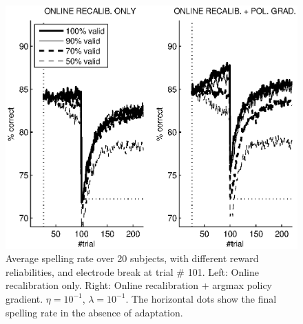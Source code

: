\documentclass[conference]{IEEEtran}
\begin{document}
\begin{figure}
\centerline{
 \includegraphics[width=\linewidth]{figs-copie/fig_invalid}
}
\caption{Average spelling rate over 20 subjects, with different reward reliabilities, and electrode break
at trial \# 101. Left: Online recalibration only. Right: Online recalibration + argmax policy gradient.
$\eta = 10^{-1}$, $\lambda = 10^{-1}$. The horizontal dots show the final spelling rate in the absence of 
adaptation.}
\label{fig:invalid}
\end{figure}
\end{document}
